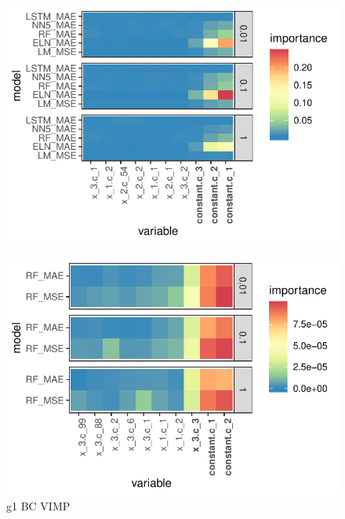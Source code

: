 \documentclass[11pt, a4paper, table]{article}
\begin{document}
\begin{figure}
	\includegraphics[]{../Results/simulation/graphics/simulation_g3_vi.pdf}
\end{figure}


\begin{figure}
	\includegraphics[]{../Results/simulation/graphics/simulation_g1_vimp_bc.pdf}
	\caption{g1 BC VIMP}
\end{figure}
\end{document}
